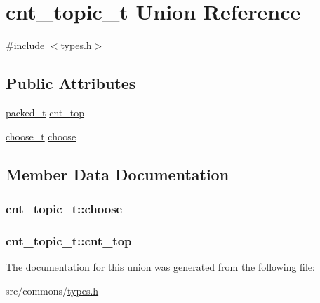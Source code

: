 \hypertarget{unioncnt__topic__t}{
\section{cnt\_\-topic\_\-t Union Reference}
\label{unioncnt__topic__t}
}


{\ttfamily \#include $<$types.h$>$}

\subsection*{Public Attributes}
\begin{DoxyCompactItemize}
\item 
\hyperlink{types_8h_a95aa2a3b7b9c0ef892ad7101ad3d6b6d}{packed\_\-t} \hyperlink{unioncnt__topic__t_a5b1431de3761abf5011d44c2dac0dac5}{cnt\_\-top}
\item 
\hyperlink{structchoose__t}{choose\_\-t} \hyperlink{unioncnt__topic__t_abffcfd18216f10cae709bb33928cb1e3}{choose}
\end{DoxyCompactItemize}


\subsection{Member Data Documentation}
\hypertarget{unioncnt__topic__t_abffcfd18216f10cae709bb33928cb1e3}{
\subsubsection[{choose}]{ {\bf cnt\_\-topic\_\-t::choose}}}
\label{unioncnt__topic__t_abffcfd18216f10cae709bb33928cb1e3}
\hypertarget{unioncnt__topic__t_a5b1431de3761abf5011d44c2dac0dac5}{
\subsubsection[{cnt\_\-top}]{ {\bf cnt\_\-topic\_\-t::cnt\_\-top}}}
\label{unioncnt__topic__t_a5b1431de3761abf5011d44c2dac0dac5}


The documentation for this union was generated from the following file:\begin{DoxyCompactItemize}
\item 
src/commons/\hyperlink{types_8h}{types.h}\end{DoxyCompactItemize}
